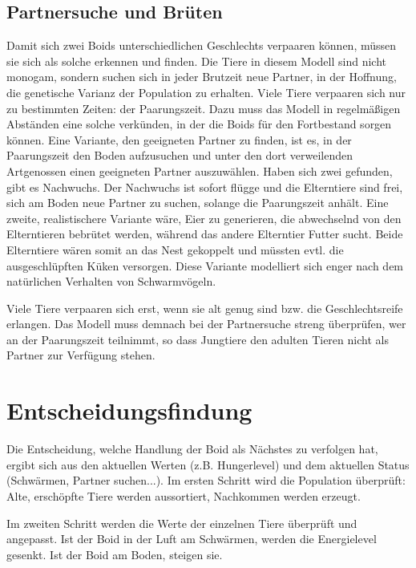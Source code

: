 \documentclass[draft=false
              ,paper=a4
              ,twoside=false
              ,fontsize=11pt
              ,headsepline
              ,BCOR10mm
              ,DIV11
              ,bibtotoc
              ,liststotoc
              ]{scrbook}
\begin{document}
\subsection{Partnersuche und Brüten}
Damit sich zwei Boids unterschiedlichen Geschlechts verpaaren können, müssen sie sich als solche erkennen und finden. Die Tiere in diesem Modell sind nicht monogam, sondern suchen sich in jeder Brutzeit neue Partner, in der Hoffnung, die genetische Varianz der Population zu erhalten.
Viele Tiere verpaaren sich nur zu bestimmten Zeiten: der Paarungszeit. Dazu muss das Modell in regelmäßigen Abständen eine solche verkünden, in der die Boids für den Fortbestand sorgen können.
Eine Variante, den geeigneten Partner zu finden, ist es, in der Paarungszeit den Boden aufzusuchen und unter den dort verweilenden Artgenossen einen geeigneten Partner auszuwählen. Haben sich zwei gefunden, gibt es Nachwuchs. Der Nachwuchs ist sofort flügge und die Elterntiere sind frei, sich am Boden neue Partner zu suchen, solange die Paarungszeit anhält.
Eine zweite, realistischere Variante wäre, Eier zu generieren, die abwechselnd von den Elterntieren bebrütet werden, während das andere Elterntier Futter sucht. Beide Elterntiere wären somit an das Nest gekoppelt und müssten evtl. die ausgeschlüpften Küken versorgen. Diese Variante modelliert sich enger nach dem natürlichen Verhalten von Schwarmvögeln.

Viele Tiere verpaaren sich erst, wenn sie alt genug sind bzw. die Geschlechtsreife erlangen. Das Modell muss demnach bei der Partnersuche streng überprüfen, wer an der Paarungszeit teilnimmt, so dass Jungtiere den adulten Tieren nicht als Partner zur Verfügung stehen.

\section{Entscheidungsfindung}
Die Entscheidung, welche Handlung der Boid als Nächstes zu verfolgen hat, ergibt sich aus den aktuellen Werten (z.B. Hungerlevel) und dem aktuellen Status (Schwärmen, Partner suchen...). Im ersten Schritt wird die Population überprüft: Alte, erschöpfte Tiere werden aussortiert, Nachkommen werden erzeugt.

Im zweiten Schritt werden die Werte der einzelnen Tiere überprüft und angepasst. Ist der Boid in der Luft am Schwärmen, werden die Energielevel gesenkt. Ist der Boid am Boden, steigen sie.
\end{document}
